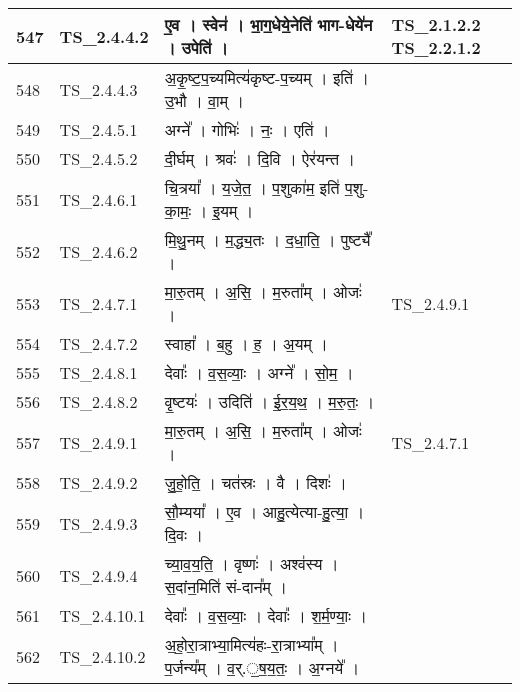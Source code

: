\documentclass[17pt]{extarticle}
\begin{document}
\begin{longtable}{||p{0.4in}||p{0.9in}||p{4.0in}||p{0.9in}||}
        \hline
            547 & TS\_2.4.4.2 & ए॒व   ।   स्वेन॑   ।   भा॒ग॒धेये॒नेति॑ भाग{-}धेये॑न   ।   उपेति॑   ।    & TS\_2.1.2.2 TS\_2.2.1.2        \\
        \hline
            548 & TS\_2.4.4.3 & अ॒कृ॒ष्ट॒प॒च्यमित्य॑कृष्ट{-}प॒च्यम्   ।   इति॑   ।   उ॒भौ   ।   वा॒म्   ।    &      \\
        \hline
            549 & TS\_2.4.5.1 & अग्ने᳚   ।   गोभिः॑   ।   नः॒   ।   एति॑   ।    &      \\
        \hline
            550 & TS\_2.4.5.2 & दी॒र्घम्   ।   श्रवः॑   ।   दि॒वि   ।   ऐर॑यन्त   ।    &      \\
        \hline
            551 & TS\_2.4.6.1 & चि॒त्रया᳚   ।   य॒जे॒त॒   ।   प॒शुका॑म॒ इति॑ प॒शु{-}का॒मः॒   ।   इ॒यम्   ।    &      \\
        \hline
            552 & TS\_2.4.6.2 & मि॒थु॒नम्   ।   म॒द्ध्य॒तः   ।   द॒धा॒ति॒   ।   पुष्ट्यै᳚   ।    &      \\
        \hline
            553 & TS\_2.4.7.1 & मा॒रु॒तम्   ।   अ॒सि॒   ।   म॒रुता᳚म्   ।   ओजः॑   ।    &  TS\_2.4.9.1       \\
        \hline
            554 & TS\_2.4.7.2 & स्वाहा᳚   ।   ब॒हु   ।   ह॒   ।   अ॒यम्   ।    &      \\
        \hline
            555 & TS\_2.4.8.1 & देवाः᳚   ।   व॒स॒व्याः॒   ।   अग्ने᳚   ।   सो॒म॒   ।    &      \\
        \hline
            556 & TS\_2.4.8.2 & वृ॒ष्टयः॑   ।   उदिति॑   ।   ई॒र॒य॒थ॒   ।   म॒रु॒तः॒   ।    &      \\
        \hline
            557 & TS\_2.4.9.1 & मा॒रु॒तम्   ।   अ॒सि॒   ।   म॒रुता᳚म्   ।   ओजः॑   ।    & TS\_2.4.7.1        \\
        \hline
            558 & TS\_2.4.9.2 & जु॒हो॒ति॒   ।   चत॑स्रः   ।   वै   ।   दिशः॑   ।    &      \\
        \hline
            559 & TS\_2.4.9.3 & सौ॒म्यया᳚   ।   ए॒व   ।   आहु॒त्येत्या{-}हु॒त्या॒   ।   दि॒वः   ।    &      \\
        \hline
            560 & TS\_2.4.9.4 & च्या॒व॒य॒ति॒   ।   वृष्णः॑   ।   अश्व॑स्य   ।   स॒दांन॒मिति॑ सं{-}दान᳚म्   ।    &      \\
        \hline
            561 & TS\_2.4.10.1 & देवाः᳚   ।   व॒स॒व्याः॒   ।   देवाः᳚   ।   श॒र्म॒ण्याः॒   ।    &      \\
        \hline
            562 & TS\_2.4.10.2 & अ॒हो॒रा॒त्राभ्या॒मित्य॑हः{-}रा॒त्राभ्या᳚म्   ।   प॒र्जन्य᳚म्   ।   व॒र्.॒ष॒य॒तः॒   ।   अ॒ग्नये᳚   ।    &      \\

\end{longtable}
\end{document}
